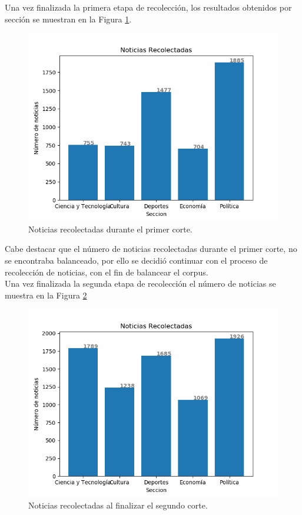 Una vez finalizada la primera etapa de recolección, los resultados obtenidos por sección se muestran en la Figura  \ref{Fig:notseccionV1}.
\begin{figure}[H]
	\centering
	\includegraphics[scale=.6]{imagenes/Capitulo5/noticiasPorSeccionV1.png}
	\caption{Noticias recolectadas durante el primer corte.}
	\label{Fig:notseccionV1}
\end{figure}

Cabe destacar que el número de noticias recolectadas durante el primer corte, no se encontraba balanceado, por ello se decidió continuar con el proceso de recolección de noticias, con el fin de balancear el corpus.
\\
Una vez finalizada la segunda etapa de recolección el número de noticias se muestra en la Figura \ref{Fig:notseccion} 

\begin{figure}[H]
	\centering
	\includegraphics[scale=.6]{imagenes/Capitulo5/noticiasPorSeccionV2.png}
	\caption{Noticias recolectadas al finalizar el segundo corte.}
	\label{Fig:notseccion}
\end{figure}


